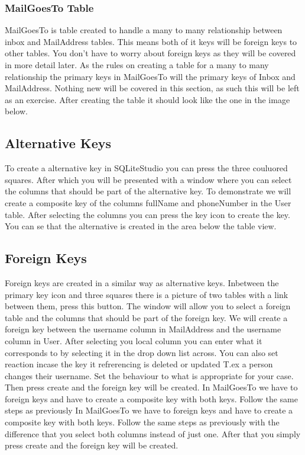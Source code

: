 \documentclass[a4paper,11pt,oneside]{article}
\begin{document}
\begin{sloppypar}
\subsubsection{MailGoesTo Table}
\label{sqliteStudioMailGoesToTable}
MailGoesTo is table created to handle a many to many relationship between inbox and MailAddress tables. This means both of it keys will be foreign keys to other tables. You don't have to worry about foreign keys as they will be covered in more detail later. As the rules on creating a table for a many to many relationship the primary keys in MailGoesTo will the primary keys of Inbox and MailAddress. Nothing new will be covered in this section, as such this will be left as an exercise. After creating the table it should look like the one in the image below. 
\subsection{Alternative Keys}
\label{sqliteStudioAlternativeKeys}
To create a alternative key in SQLiteStudio you can press the three couluored squares. After which you will be presented with a window where you can select the columns that should be part of the alternative key. To demonstrate we will create a composite key of the columns fullName and phoneNumber in the User table. After selecting the columns you can press the key icon to create the key. You can se that the alternative is created in the area below the table view.
\subsection{Foreign Keys}
\label{sqliteStudioForeignKeys}
Foreign keys are created in a similar way as alternative keys. Inbetween the primary key icon and three squares there is a picture of two tables with a link between them, press this button. The window will allow you to select a foreign table and the columns that should be part of the foreign key. We will create a foreign key between the username column in MailAddress and the username column in User. After selecting you local column you can enter what it corresponds to by selecting it in the drop down list across.  You can also set reaction incase the key it refrerencing is deleted or updated T.ex a person changes their username. Set the behaviour to what is appropriate for your case. Then press create and the foreign key will be created. In MailGoesTo we have to foreign keys and have to create a composite key with both keys. Follow the same steps as previously    
In MailGoesTo we have to foreign keys and have to create a composite key with both keys. Follow the same steps as previously with the difference that you select both columns instead of just one. After that you simply press create and the foreign key will be created.

\end{sloppypar}
\end{document}
